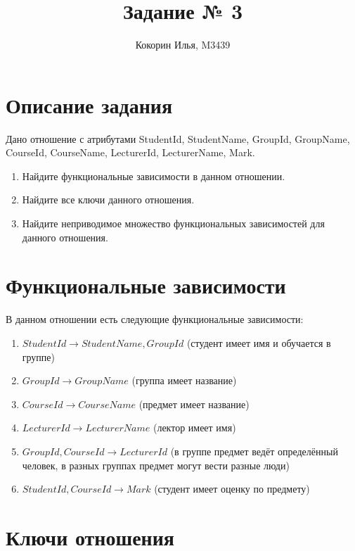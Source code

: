 \documentclass{article}
\title{Задание № 3}
\author{Кокорин Илья, M3439}
\begin{document}
	\maketitle
	
	\section{Описание задания}
	
	Дано отношение с атрибутами StudentId, StudentName, GroupId, GroupName, CourseId, CourseName, LecturerId, LecturerName, Mark.
	
	\begin{enumerate}
		\item Найдите функциональные зависимости в данном отношении.
		\item Найдите все ключи данного отношения.
		\item Найдите неприводимое множество функциональных зависимостей для данного отношения.
	\end{enumerate}
	
	\section{Функциональные зависимости}
	
	В данном отношении есть следующие функциональные зависимости:
	
	\begin{enumerate}
		\item $StudentId \rightarrow StudentName, GroupId$ (студент имеет имя и обучается в группе)
		
		\item $GroupId \rightarrow GroupName$ (группа имеет название)
		
		\item $CourseId \rightarrow CourseName$ (предмет имеет название)
		
		\item $LecturerId \rightarrow LecturerName$ (лектор имеет имя)
		
		\item $GroupId, CourseId \rightarrow LecturerId$ (в группе предмет ведёт определённый человек, в 
		разных группах предмет могут вести разные люди)
		
		\item $StudentId, CourseId \rightarrow Mark$ (студент имеет оценку по предмету)
	\end{enumerate}

	\section{Ключи отношения}
	
\end{document}

